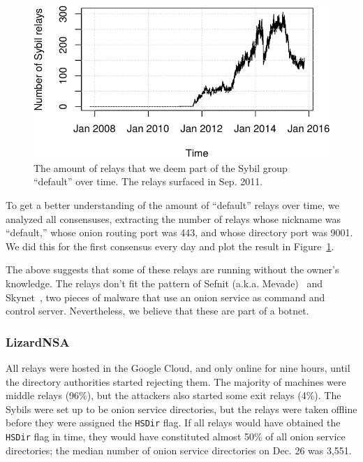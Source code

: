 \begin{figure}[t]
	\centering
	\includegraphics[width=\linewidth]{diagrams/default-over-time}
	\caption{The amount of relays that we deem part of the Sybil group
	``default'' over time.  The relays surfaced in Sep. 2011.}
	\label{fig:default-over-time}
\end{figure}

To get a better understanding of the amount of ``default'' relays over time, we
analyzed all consensuses, extracting the number of relays whose nickname was
``default,'' whose onion routing port was 443, and whose directory port was
9001.  We did this for the first consensus every day and plot the result in
Figure~\ref{fig:default-over-time}.

The above suggests that some of these relays are running without the owner's
knowledge.  The relays don't fit the pattern of Sefnit (a.k.a.
Mevade)~\cite{sefnit} and Skynet~\cite{skynet}, two pieces of malware that use
an onion service as command and control server.  Nevertheless, we believe that
these are part of a botnet.

\subsubsection{LizardNSA}
All relays were hosted in the Google Cloud, and only online for nine hours,
until the directory authorities started rejecting them.  The majority of
machines were middle relays (96\%), but the attackers also started some exit
relays (4\%).  The Sybils were set up to be onion service directories, but the
relays were taken offline before they were assigned the \texttt{HSDir} flag.  If
all relays would have obtained the \texttt{HSDir} flag in time, they would have
constituted almost 50\% of all onion service directories; the median number of
onion service directories on Dec. 26 was 3,551.

